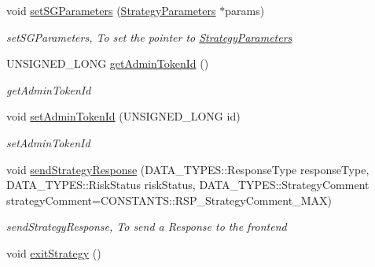 \begin{DoxyCompactItemize}
void \hyperlink{class_a_p_i2_1_1_s_g_context_afe58c09f474cdfabc70c81b51e30acca}{set\-S\-G\-Parameters} (\hyperlink{class_a_p_i2_1_1_strategy_parameters}{Strategy\-Parameters} $\ast$params)
\begin{DoxyCompactList}\small\item\em set\-S\-G\-Parameters, To set the pointer to \hyperlink{class_a_p_i2_1_1_strategy_parameters}{Strategy\-Parameters} \end{DoxyCompactList}\item 
U\-N\-S\-I\-G\-N\-E\-D\-\_\-\-L\-O\-N\-G \hyperlink{class_a_p_i2_1_1_s_g_context_af3455b23fcf0866bbd7634fff735e9b6}{get\-Admin\-Token\-Id} ()
\begin{DoxyCompactList}\small\item\em get\-Admin\-Token\-Id \end{DoxyCompactList}\item 
void \hyperlink{class_a_p_i2_1_1_s_g_context_abc5afbec664b4d30d6700195e4de0927}{set\-Admin\-Token\-Id} (U\-N\-S\-I\-G\-N\-E\-D\-\_\-\-L\-O\-N\-G id)
\begin{DoxyCompactList}\small\item\em set\-Admin\-Token\-Id \end{DoxyCompactList}\item 
void \hyperlink{class_a_p_i2_1_1_s_g_context_a214587777e22c6238afebc381069a96b}{send\-Strategy\-Response} (D\-A\-T\-A\-\_\-\-T\-Y\-P\-E\-S\-::\-Response\-Type response\-Type, D\-A\-T\-A\-\_\-\-T\-Y\-P\-E\-S\-::\-Risk\-Status risk\-Status, D\-A\-T\-A\-\_\-\-T\-Y\-P\-E\-S\-::\-Strategy\-Comment strategy\-Comment=C\-O\-N\-S\-T\-A\-N\-T\-S\-::\-R\-S\-P\-\_\-\-Strategy\-Comment\-\_\-\-M\-A\-X)
\begin{DoxyCompactList}\small\item\em send\-Strategy\-Response, To send a Response to the frontend \end{DoxyCompactList}\item 
\hypertarget{class_a_p_i2_1_1_s_g_context_a6bd0841e7c06539eeaaf04e174882cda}{void \hyperlink{class_a_p_i2_1_1_s_g_context_a6bd0841e7c06539eeaaf04e174882cda}{exit\-Strategy} ()}\label{class_a_p_i2_1_1_s_g_context_a6bd0841e7c06539eeaaf04e174882cda}


\end{DoxyCompactItemize}
